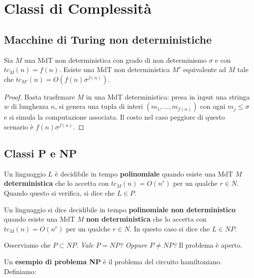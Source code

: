 \section{Classi di Complessità}

\subsection{Macchine di Turing non deterministiche}

\begin{lemm}
	Sia $M$ una MdT non deterministica con grado di non determinismo $\sigma$ e con $tc_M(n) = f(n)$. Esiste una MdT non deterministica $M'$ equivalente ad $M$ tale che $tc_{M'}(n) = O(f(n)\sigma^{f(n)})$.
\end{lemm}

\begin{proof}
	Basta trasfrmare $M$ in una MdT deterministica: presa in input una stringa $w$ di lunghezza $n$, si genera una tupla di interi $(m_1, \ldots, m_{f(n)})$ con ogni $m_j \leq \sigma$ e si simula la computazione associata. Il costo nel caso peggiore di questo scenario è $f(n)\sigma^{f(n)}$.
\end{proof}

\subsection{Classi P e NP}

\begin{defn}
	Un linguaggio $L$ è decidibile in tempo \textbf{polinomiale} quando esiste una MdT $M$ \textbf{deterministica} che lo accetta con $tc_M(n) = O(n^r)$ per un qualche $r \in N$. Quando questo si verifica, si dice che $L \in P$.
\end{defn}

\vspace{0.2cm}

\begin{defn}
	Un linguaggio si dice decidibile in tempo \textbf{polinomiale non deterministico} quando esiste una MdT $M$ \textbf{non deterministica} che lo accetta con $tc_M(n) = O(n^r)$ per un qualche $r \in N$. In questo caso si dice che $L \in NP$.
\end{defn}

Osserviamo che $P \subset NP$. \textit{Vale $P = NP$? Oppure $P \neq NP$?} Il problema è aperto.

Un \textbf{esempio di problema NP} è il problema del circuito hamiltoniano. Definiamo:

